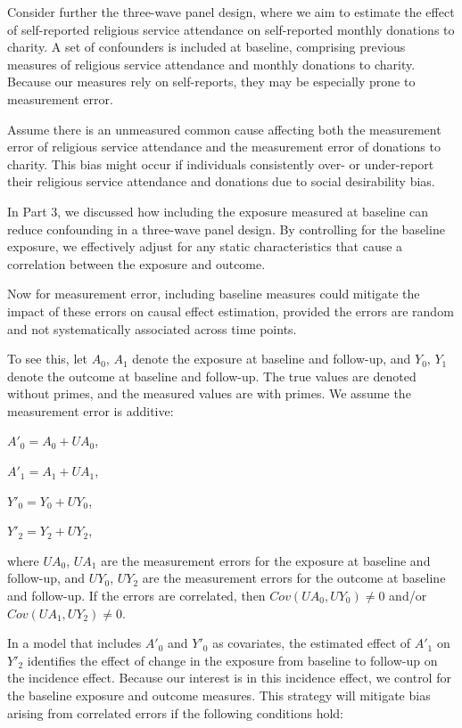 \documentclass[
  singlecolumn]{report}
\begin{document}
Consider further the three-wave panel design, where we aim to estimate
the effect of self-reported religious service attendance on
self-reported monthly donations to charity. A set of confounders is
included at baseline, comprising previous measures of religious service
attendance and monthly donations to charity. Because our measures rely
on self-reports, they may be especially prone to measurement error.

Assume there is an unmeasured common cause affecting both the
measurement error of religious service attendance and the measurement
error of donations to charity. This bias might occur if individuals
consistently over- or under-report their religious service attendance
and donations due to social desirability bias.

In Part 3, we discussed how including the exposure measured at baseline
can reduce confounding in a three-wave panel design. By controlling for
the baseline exposure, we effectively adjust for any static
characteristics that cause a correlation between the exposure and
outcome.

Now for measurement error, including baseline measures could mitigate
the impact of these errors on causal effect estimation, provided the
errors are random and not systematically associated across time points.

To see this, let \(A_0\), \(A_1\) denote the exposure at baseline and
follow-up, and \(Y_0\), \(Y_1\) denote the outcome at baseline and
follow-up. The true values are denoted without primes, and the measured
values are with primes. We assume the measurement error is additive:

\(A'_0 = A_0 + UA_0\),

\(A'_1 = A_1 + UA_1\),

\(Y'_0 = Y_0 + UY_0\),

\(Y'_2 = Y_2 + UY_2\),

where \(UA_0\), \(UA_1\) are the measurement errors for the exposure at
baseline and follow-up, and \(UY_0\), \(UY_2\) are the measurement
errors for the outcome at baseline and follow-up. If the errors are
correlated, then \(Cov(UA_0, UY_0) \neq 0\) and/or
\(Cov(UA_1, UY_2) \neq 0\).

In a model that includes \(A'_0\) and \(Y'_0\) as covariates, the
estimated effect of \(A'_1\) on \(Y'_2\) identifies the effect of change
in the exposure from baseline to follow-up on the incidence effect.
Because our interest is in this incidence effect, we control for the
baseline exposure and outcome measures. This strategy will mitigate bias
arising from correlated errors if the following conditions hold:
\end{document}

